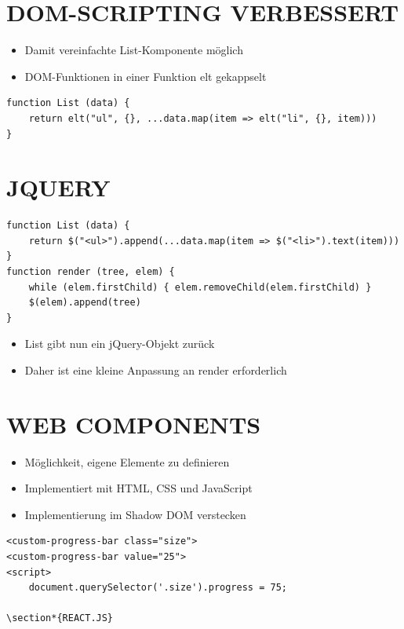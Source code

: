 \documentclass[10pt]{article}
\begin{document}
\section*{DOM-SCRIPTING VERBESSERT}
\begin{itemize}
  \item Damit vereinfachte List-Komponente möglich
  \item DOM-Funktionen in einer Funktion elt gekappselt
\end{itemize}

\begin{verbatim}
function List (data) {
    return elt("ul", {}, ...data.map(item => elt("li", {}, item)))
}
\end{verbatim}

\section*{JQUERY}
\begin{verbatim}
function List (data) {
    return $("<ul>").append(...data.map(item => $("<li>").text(item)))
}
function render (tree, elem) {
    while (elem.firstChild) { elem.removeChild(elem.firstChild) }
    $(elem).append(tree)
}
\end{verbatim}

\begin{itemize}
  \item List gibt nun ein jQuery-Objekt zurück
  \item Daher ist eine kleine Anpassung an render erforderlich
\end{itemize}

\section*{WEB COMPONENTS}
\begin{itemize}
  \item Möglichkeit, eigene Elemente zu definieren
  \item Implementiert mit HTML, CSS und JavaScript
  \item Implementierung im Shadow DOM verstecken
\end{itemize}

\begin{verbatim}
<custom-progress-bar class="size">
<custom-progress-bar value="25">
<script>
    document.querySelector('.size').progress = 75;

\section*{REACT.JS}
\end{verbatim}
\end{document}
